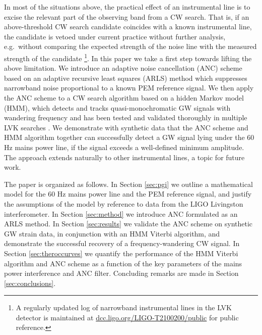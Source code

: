 \documentclass[pra,superscriptaddress,reprint,amsmath,amssymb,nofootinbib]{revtex4-2}
\begin{document}
In most  of the situations above, the practical effect of an instrumental line is to excise the relevant part of the observing band from a CW search. That is, if an above-threshold CW search candidate coincides with a known instrumental line, the candidate is vetoed under current practice without further analysis, e.g.\ without comparing the expected strength of the noise line with the measured strength of the candidate \footnote{A regularly updated log of narrowband instrumental lines in the LVK detector is maintained at \href{https://dcc.ligo.org/LIGO-T2100200/public}{dcc.ligo.org/LIGO-T2100200/public} for public reference.}. In this paper we take a first step towards lifting the above limitation. We introduce an adaptive noise cancellation (ANC) scheme  based on an adaptive recursive least squares (ARLS) method which suppresses narrowband noise proportional to a known PEM reference signal. We then apply the ANC scheme to a CW search algorithm based on a hidden Markov model (HMM), which detects and tracks quasi-monochromatic GW signals with wandering frequency and has been tested and validated thoroughly in multiple LVK searches \cite{Suvorova2016PhRv,Piccinni2022,Riles2023,Wette2023}. We demonstrate with synthetic data that the ANC scheme and HMM algorithm together can successfully detect a GW signal lying under the 60 Hz mains power line, if the signal exceeds a well-defined minimum amplitude. The approach extends naturally to other instrumental lines, a topic for future work. \newline 

The paper is organized as follows. In Section \ref{sec:pgi} we outline a mathematical model for the 60 Hz mains power line and the PEM reference signal, and justify the assumptions of the model by reference to data from the LIGO Livingston interferometer.  In Section \ref{sec:method} we introduce ANC formulated as an ARLS method. In Section \ref{sec:results} we validate the ANC scheme on synthetic GW strain data, in conjunction with an HMM Viterbi algorithm, and demonstrate the successful recovery of a frequency-wandering CW signal. In Section \ref{sec:theroccurves} we quantify the performance of the HMM Viterbi algorithm and ANC scheme as a function of the key parameters of the mains power interference and ANC filter. Concluding remarks are made in Section \ref{sec:conclusions}.
\end{document}
